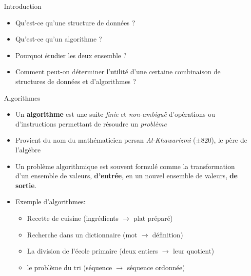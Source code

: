\begin{frame}{Introduction}
\begin{itemize}
\item Qu'est-ce qu'une structure de données ?
\item Qu'est-ce qu'un algorithme ?
\item Pourquoi étudier les deux ensemble ?
\item Comment peut-on déterminer l'utilité d'une certaine combinaison de structures de données et d'algorithmes ?
\end{itemize}
\end{frame}

\begin{frame}{Algorithmes}

\begin{itemize}
\item Un {\bf algorithme} est une suite {\em finie} et {\em non-ambiguë} d'opérations ou d'instructions permettant de résoudre un {\em problème}
\item Provient du nom du mathématicien persan {\em Al-Khawarizmi}
  ($\pm 820$), le père de l'algèbre
\item Un problème algorithmique est souvent formulé comme la
  transformation d'un ensemble de valeurs, {\bf d'entrée}, en un
  nouvel ensemble de valeurs, {\bf de sortie}.
\item Exemple d'algorithmes:
\begin{itemize}
\item Recette de cuisine (ingrédients $\rightarrow$ plat préparé)
\item Recherche dans un dictionnaire (mot $\rightarrow$ définition)
\item La division de l'école primaire (deux entiers $\rightarrow$ leur quotient)
\item le problème du tri (séquence $\rightarrow$ séquence ordonnée)
\end{itemize}
\end{itemize}

\end{frame}


